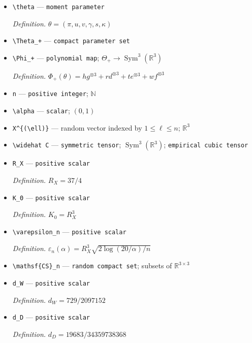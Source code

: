 \documentclass{article}
\begin{document}
\begin{itemize}
  \item \texttt{\textbackslash{}\allowbreak{}theta} --- \texttt{moment parameter}
  \par\smallskip\noindent\emph{Definition.} \(\theta=(\pi,u,v,\gamma,s,\kappa)\)
  \item \texttt{\textbackslash{}\allowbreak{}Theta\_\allowbreak{}+\allowbreak{}} --- \texttt{compact parameter set}
  \item \texttt{\textbackslash{}\allowbreak{}Phi\_\allowbreak{}+\allowbreak{}} --- \texttt{polynomial map}; \(\Theta_+\to\operatorname{Sym}^3(\mathbb R^3)\)
  \par\smallskip\noindent\emph{Definition.} \(\Phi_+(\theta)=hg^{\otimes3}+rd^{\otimes3}+te^{\otimes3}+wf^{\otimes3}\)
  \item \texttt{n} --- \texttt{positive integer}; \(\mathbb N\)
  \item \texttt{\textbackslash{}\allowbreak{}alpha} --- \texttt{scalar}; \((0,1)\)
  \item \texttt{X\textasciicircum{}\{(\textbackslash{}\allowbreak{}ell)\}\allowbreak{}} --- random vector indexed by \(1\le\ell\le n\); \(\mathbb R^3\)
  \item \texttt{\textbackslash{}\allowbreak{}widehat C} --- \texttt{symmetric tensor}; \(\operatorname{Sym}^3(\mathbb R^3)\); \texttt{empirical cubic tensor}
  \item \texttt{R\_\allowbreak{}X} --- \texttt{positive scalar}
  \par\smallskip\noindent\emph{Definition.} \(R_X=37/4\)
  \item \texttt{K\_\allowbreak{}0} --- \texttt{positive scalar}
  \par\smallskip\noindent\emph{Definition.} \(K_0=R_X^3\)
  \item \texttt{\textbackslash{}\allowbreak{}varepsilon\_\allowbreak{}n} --- \texttt{positive scalar}
  \par\smallskip\noindent\emph{Definition.} \(\varepsilon_n(\alpha)=R_X^3\sqrt{2\log(20/\alpha)/n}\)
  \item \texttt{\textbackslash{}\allowbreak{}mathsf\{CS\}\allowbreak{}\_\allowbreak{}n} --- \texttt{random compact set}; subsets of \(\mathbb R^{3\times3}\)
  \item \texttt{d\_\allowbreak{}W} --- \texttt{positive scalar}
  \par\smallskip\noindent\emph{Definition.} \(d_W=729/2097152\)
  \item \texttt{d\_\allowbreak{}D} --- \texttt{positive scalar}
  \par\smallskip\noindent\emph{Definition.} \(d_D=19683/34359738368\)

\end{itemize}
\end{document}
